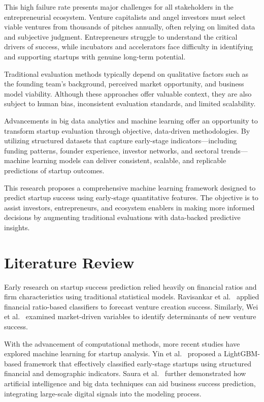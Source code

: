 \documentclass[conference]{IEEEtran}
\begin{document}
This high failure rate presents major challenges for all stakeholders in the entrepreneurial ecosystem. Venture capitalists and angel investors must select viable ventures from thousands of pitches annually, often relying on limited data and subjective judgment. Entrepreneurs struggle to understand the critical drivers of success, while incubators and accelerators face difficulty in identifying and supporting startups with genuine long-term potential.

Traditional evaluation methods typically depend on qualitative factors such as the founding team's background, perceived market opportunity, and business model viability. Although these approaches offer valuable context, they are also subject to human bias, inconsistent evaluation standards, and limited scalability.

Advancements in big data analytics and machine learning offer an opportunity to transform startup evaluation through objective, data-driven methodologies. By utilizing structured datasets that capture early-stage indicators—including funding patterns, founder experience, investor networks, and sectoral trends—machine learning models can deliver consistent, scalable, and replicable predictions of startup outcomes.

This research proposes a comprehensive machine learning framework designed to predict startup success using early-stage quantitative features. The objective is to assist investors, entrepreneurs, and ecosystem enablers in making more informed decisions by augmenting traditional evaluations with data-backed predictive insights.



\section{Literature Review}

Early research on startup success prediction relied heavily on financial ratios and firm characteristics using traditional statistical models. Ravisankar et al.~\cite{ravisankar2011predicting} applied financial ratio-based classifiers to forecast venture creation success. Similarly, Wei et al.~\cite{wei2008market} examined market-driven variables to identify determinants of new venture success.

With the advancement of computational methods, more recent studies have explored machine learning for startup analysis. Yin et al.~\cite{yin2021lightgbm} proposed a LightGBM-based framework that effectively classified early-stage startups using structured financial and demographic indicators. Saura et al.~\cite{saura2021predicting} further demonstrated how artificial intelligence and big data techniques can aid business success prediction, integrating large-scale digital signals into the modeling process.
\end{document}

